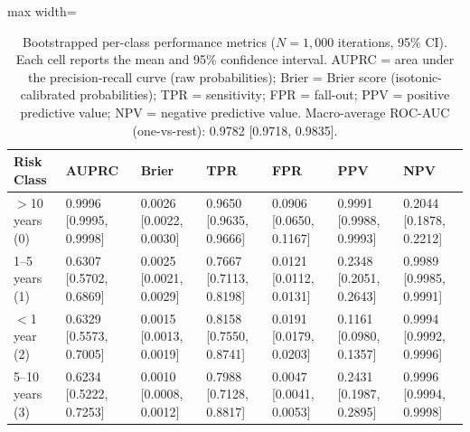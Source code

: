 \documentclass{article}
\begin{document}
\begin{table}[h]
\caption{Bootstrapped per-class performance metrics ($N=1{,}000$ iterations, 95\% CI). Each cell reports the mean and 95\% confidence interval. AUPRC = area under the precision-recall curve (raw probabilities); Brier = Brier score (isotonic-calibrated probabilities); TPR = sensitivity; FPR = fall-out; PPV = positive predictive value; NPV = negative predictive value. Macro-average ROC-AUC (one-vs-rest): 0.9782 [0.9718, 0.9835].}
\label{tab:bootstrap_metrics}
\begin{adjustbox}{max width=\textwidth}
\begin{tabular}{lllllll}
\toprule
Risk Class & AUPRC & Brier & TPR & FPR & PPV & NPV \\
\midrule
$>$10 years (0) & 0.9996 [0.9995, 0.9998] & 0.0026 [0.0022, 0.0030] & 0.9650 [0.9635, 0.9666] & 0.0906 [0.0650, 0.1167] & 0.9991 [0.9988, 0.9993] & 0.2044 [0.1878, 0.2212] \\
1--5 years (1) & 0.6307 [0.5702, 0.6869] & 0.0025 [0.0021, 0.0029] & 0.7667 [0.7113, 0.8198] & 0.0121 [0.0112, 0.0131] & 0.2348 [0.2051, 0.2643] & 0.9989 [0.9985, 0.9991] \\
$<$1 year (2)   & 0.6329 [0.5573, 0.7005] & 0.0015 [0.0013, 0.0019] & 0.8158 [0.7550, 0.8741] & 0.0191 [0.0179, 0.0203] & 0.1161 [0.0980, 0.1357] & 0.9994 [0.9992, 0.9996] \\
5--10 years (3) & 0.6234 [0.5222, 0.7253] & 0.0010 [0.0008, 0.0012] & 0.7988 [0.7128, 0.8817] & 0.0047 [0.0041, 0.0053] & 0.2431 [0.1987, 0.2895] & 0.9996 [0.9994, 0.9998] \\
\bottomrule
\end{tabular}
\end{adjustbox}
\end{table}
\end{document}
